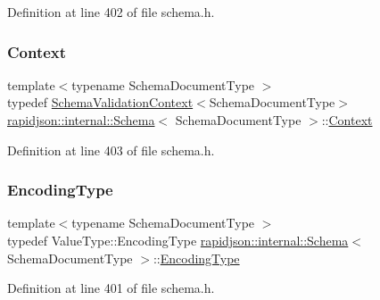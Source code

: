 Definition at line 402 of file schema.\+h.

\mbox{\label{classrapidjson_1_1internal_1_1_schema_afca06b1f51d1bc18403bdf3f4d55ffef}} 
\subsubsection{\texorpdfstring{Context}{Context}}
{\footnotesize\ttfamily template$<$typename Schema\+Document\+Type $>$ \\
typedef \mbox{\hyperlink{structrapidjson_1_1internal_1_1_schema_validation_context}{Schema\+Validation\+Context}}$<$Schema\+Document\+Type$>$ \mbox{\hyperlink{classrapidjson_1_1internal_1_1_schema}{rapidjson\+::internal\+::\+Schema}}$<$ Schema\+Document\+Type $>$\+::\mbox{\hyperlink{classrapidjson_1_1internal_1_1_schema_afca06b1f51d1bc18403bdf3f4d55ffef}{Context}}}



Definition at line 403 of file schema.\+h.

\mbox{\label{classrapidjson_1_1internal_1_1_schema_a39c052d3d1c7431fefc228c1007d0ecb}} 
\subsubsection{\texorpdfstring{EncodingType}{EncodingType}}
{\footnotesize\ttfamily template$<$typename Schema\+Document\+Type $>$ \\
typedef Value\+Type\+::\+Encoding\+Type \mbox{\hyperlink{classrapidjson_1_1internal_1_1_schema}{rapidjson\+::internal\+::\+Schema}}$<$ Schema\+Document\+Type $>$\+::\mbox{\hyperlink{classrapidjson_1_1internal_1_1_schema_a39c052d3d1c7431fefc228c1007d0ecb}{Encoding\+Type}}}



Definition at line 401 of file schema.\+h.


